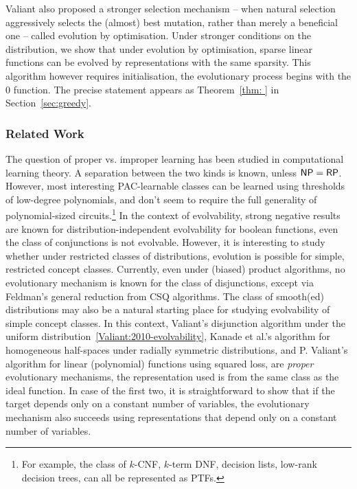 Valiant also proposed a stronger selection mechanism -- when natural selection
aggressively selects the (almost) best mutation, rather than merely a beneficial
one -- called evolution by optimisation.  Under stronger conditions on the
distribution, we show that under evolution by optimisation, sparse linear
functions can be evolved by representations with the same sparsity. This
algorithm however requires initialisation, \ie the evolutionary process
begins with the $0$ function. The precise statement appears as Theorem~\ref{thm:
} in Section~\ref{sec:greedy}.

\subsubsection*{Related Work}

The question of proper vs. improper learning has been studied in computational
learning theory. A separation between the two kinds is known, unless $\mathsf{NP} =
\mathsf{RP}$. However, most interesting PAC-learnable classes can be learned using
thresholds of low-degree polynomials, and don't seem to require the full
generality of polynomial-sized circuits.\footnote{For example, the class of
$k$-CNF, $k$-term DNF, decision lists, low-rank decision trees, can all be
represented as PTFs.} In the context of evolvability, strong negative results
are known for distribution-independent evolvability for boolean functions, \eg
even the class of conjunctions is not evolvable. However, it is interesting to
study whether under restricted classes of distributions, evolution is possible
for simple, restricted concept classes. Currently, even under (biased) product
algorithms, no evolutionary mechanism is known for the class of disjunctions,
except via Feldman's general reduction from CSQ algorithms. The class of
smooth(ed) distributions may also be a natural starting place for studying
evolvability of simple concept classes. In this context, Valiant's disjunction
algorithm under the uniform distribution~\ref{Valiant:2010-evolvability}, Kanade
et al.'s algorithm for homogeneous half-spaces under radially symmetric
distributions, and P. Valiant's algorithm for linear (polynomial) functions
using squared loss, are \emph{proper} evolutionary mechanisms, \ie the
representation used is from the same class as the ideal function. In case of the
first two, it is straightforward to show that if the target depends only on a
constant number of variables, the evolutionary mechanism also succeeds using
representations that depend only on a constant number of variables.

